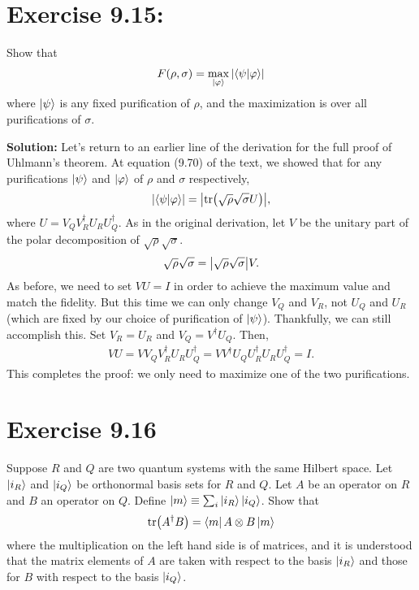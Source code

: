 \documentclass{book}
\begin{document}
\section*{Exercise 9.15:}
    Show that
    \begin{align}
        F(\rho, \sigma) = \max_{\ket{\varphi}} \abs{\bra{\psi}\ket{\varphi}}
    \end{align}
    where $\ket{\psi}$ is any fixed purification of $\rho$, and the maximization is over all purifications of $\sigma$.
    
    \textbf{Solution:} Let's return to an earlier line of the derivation for the full proof of Uhlmann's theorem. At equation (9.70) of the text, we showed that for any purifications $\ket{\psi}$ and $\ket{\varphi}$ of $\rho$ and $\sigma$ respectively,
    \begin{align}
        \abs{\bra{\psi}\ket{\varphi}} = \abs{\tr(\sqrt{\rho}\sqrt{\sigma}U)},
    \end{align}
    where $U = V_Q V_R^\dagger U_R U_Q^\dagger$. As in the original derivation, let $V$ be the unitary part of the polar decomposition of $\sqrt{\rho}\sqrt{\sigma}$.
    \begin{align}
        \sqrt{\rho}\sqrt{\sigma} = \abs{\sqrt{\rho}\sqrt{\sigma}} V.
    \end{align}
    As before, we need to set $VU=I$ in order to achieve the maximum value and match the fidelity. But this time we can only change $V_Q$ and $V_R$, not $U_Q$ and $U_R$ (which are fixed by our choice of purification of $\ket{\psi}$). Thankfully, we can still accomplish this. Set $V_R = U_R$ and $V_Q = V^\dagger U_Q$. Then,
    \begin{align}
        VU = V V_Q V_R^\dagger U_R U_Q^\dagger = V V^\dagger U_Q U_R^\dagger U_R U_Q^\dagger = I.
    \end{align}
    This completes the proof: we only need to maximize one of the two purifications.
    
\section*{Exercise 9.16}
    Suppose $R$ and $Q$ are two quantum systems with the same Hilbert space. Let $\ket{i_R}$ and $\ket{i_Q}$ be orthonormal basis sets for $R$ and $Q$. Let $A$ be an operator on $R$ and $B$ an operator on $Q$. Define $\ket{m} \equiv \sum_i \ket{i_R}\ket{i_Q}$. Show that
    \begin{align}
        \tr(A^\dagger B) = \bra{m} A \otimes B \ket{m}
    \end{align}
    where the multiplication on the left hand side is of matrices, and it is understood that the matrix elements of $A$ are taken with respect to the basis $\ket{i_R}$ and those for $B$ with respect to the basis $\ket{i_Q}$.
    
\end{document}
